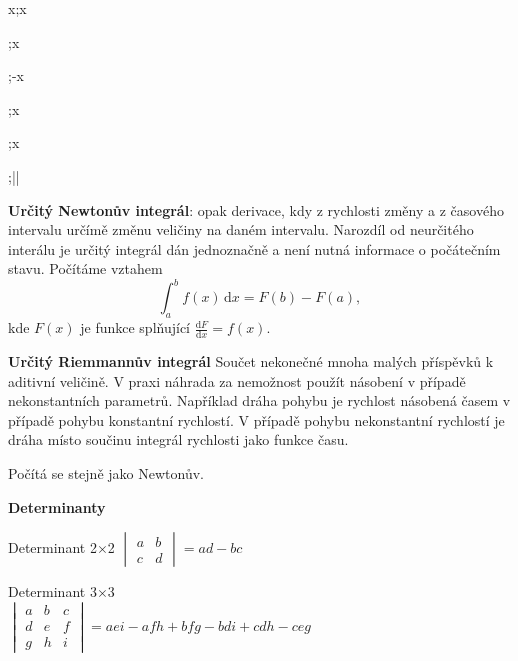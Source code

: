 \documentclass{article}
\def\tg{\mathop{\mathrm{tg}}}
\def\arctg{\mathop{\mathrm{arctg}}}
\def\cotg{\mathop{\mathrm{cotg}}}
\begin{document}
\begin{multicols}{3}
{{\begin{minipage}[t]{0.42\linewidth}
  \integral \cos x;\sin x

\end{minipage}\hfil\vrule\hfil
\begin{minipage}[t]{0.53\linewidth}
\parskip 3pt

  \integral {};\tg x

  \integral {};-\cotg x


  \integral {};\arcsin x

  \integral {};\arctg x

  \integral {};\ln\left|\right|

\end{minipage}}
}



\textbf{Určitý Newtonův integrál}: opak derivace, kdy z rychlosti změny a z časového intervalu určímě změnu veličiny na daném intervalu. Narozdíl od neurčitého interálu je určitý integrál dán jednoznačně a není nutná informace o počátečním stavu. Počítáme vztahem 
$$\int_a^bf(x)\,\mathrm dx=F(b)-F(a),$$
kde $F(x)$ je funkce splňující $\frac{\mathrm dF}{\mathrm dx}=f(x).$

\textbf{Určitý Riemmannův integrál} Součet nekonečné mnoha malých příspěvků k aditivní veličině. V praxi náhrada za nemožnost použít násobení v případě nekonstantních parametrů. Například dráha pohybu je rychlost násobená časem v případě pohybu konstantní rychlostí. V případě pohybu nekonstantní rychlostí je dráha místo součinu integrál rychlosti jako funkce času.

Počítá se stejně jako Newtonův. 

\vfill
\null
{}

\columnbreak


\textbf{Determinanty}

\let\oldtextbf\textbf
\def\textbf{\smallskip\hrule\oldtextbf}
\vspace*{-10pt}

Determinant 2$\times$2 \hfill$
\begin{vmatrix}
  a & b \\ c &d
\end{vmatrix}
=ad-bc
$

Determinant 3$\times$3 \\\null\hfill$
\begin{vmatrix}
  a & b & c \\ d & e &f \\ g & h & i
\end{vmatrix}
=aei-afh+bfg-bdi+cdh-ceg
$\hfill\null


\end{multicols}
\end{document}
